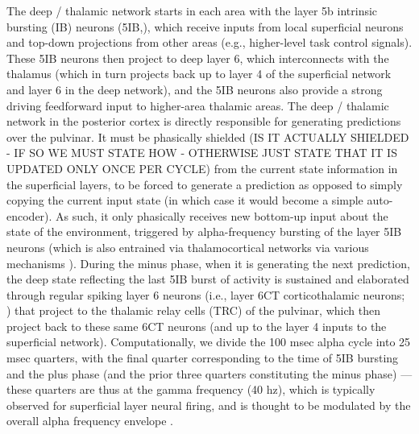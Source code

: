 \documentclass[11pt,twoside]{article}
\newif\myifpdf
\begin{document}
The deep / thalamic network starts in each area with the layer 5b intrinsic bursting (IB) neurons (5IB,), which receive inputs from local superficial neurons and top-down projections from other areas (e.g., higher-level task control signals).  These 5IB neurons then project to deep layer 6, which interconnects with the thalamus (which in turn projects back up to layer 4 of the superficial network and layer 6 in the deep network), and the 5IB neurons also provide a strong driving feedforward input to higher-area thalamic areas. The deep / thalamic network in the posterior cortex is directly responsible for generating predictions over the pulvinar.  It must be phasically shielded (IS IT ACTUALLY SHIELDED - IF SO WE MUST STATE HOW - OTHERWISE JUST STATE THAT IT IS UPDATED ONLY ONCE PER CYCLE) from the current state information in the superficial layers, to be forced to generate a prediction as opposed to simply copying the current input state (in which case it would become a simple auto-encoder).  As such, it only phasically receives new bottom-up input about the state of the environment, triggered by alpha-frequency bursting of the layer 5IB neurons (which is also entrained via thalamocortical networks via various mechanisms ).  During the minus phase, when it is generating the next prediction, the deep state reflecting the last 5IB burst of activity is sustained and elaborated through regular spiking layer 6 neurons (i.e., layer 6CT corticothalamic neurons; ) that project to the thalamic relay cells (TRC) of the pulvinar, which then project back to these same 6CT neurons (and up to the layer 4 inputs to the superficial network).  Computationally, we divide the 100 msec alpha cycle into 25 msec quarters, with the final quarter corresponding to the time of 5IB bursting and the plus phase (and the prior three quarters constituting the minus phase) --- these quarters are thus at the gamma frequency (40 hz), which is typically observed for superficial layer neural firing, and is thought to be modulated by the overall alpha frequency envelope \cite{DoughertyCoxNinomiyaEtAl17,vanKerkoerleSelfDagninoEtAl14,HaegensNacherLunaEtAl11,LakatosKarmosMehtaEtAl08,SpaakBonnefondMaierEtAl12,BollimuntaMoSchroederEtAl11,BollimuntaChenSchroederEtAl08}.
\end{document}
